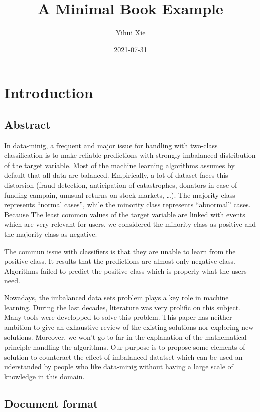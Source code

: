 \documentclass[
]{report}
\title{A Minimal Book Example}
\author{Yihui Xie}
\date{2021-07-31}
\begin{document}
\maketitle

{
\setcounter{tocdepth}{1}
\tableofcontents
}
\hypertarget{introduction}{%
\chapter{Introduction}\label{introduction}}

\hypertarget{abstract}{%
\section{Abstract}\label{abstract}}

In data-minig, a frequent and major issue for handling with two-class classification is to make reliable predictions with strongly imbalanced distribution of the target variable. Most of the machine learning algorithms assumes by default that all data are balanced. Empirically, a lot of dataset faces this distorsion (fraud detection, anticipation of catastrophes, donators in case of funding campain, unusual returns on stock markets, \ldots). The majority class represents ``normal cases'', while the minority class represents ``abnormal'' cases. Because The least common values of the target variable are linked with events which are very relevant for users, we considered the minority class as positive and the majority class as negative.

The commun issue with classifiers is that they are unable to learn from the positive class. It results that the predictions are almost only negative class. Algorithms failed to predict the positive class which is properly what the users need.

Nowadays, the imbalanced data sets problem plays a key role in machine learning. During the last decades, literature was very prolific on this subject. Many tools were developped to solve this problem. This paper has neither ambition to give an exhaustive review of the existing solutions nor exploring new solutions. Moreover, we won't go to far in the explanation of the mathematical principle handling the algorithms. Our purpose is to propose some elements of solution to counteract the effect of imbalanced datatset which can be used an uderstanded by people who like data-minig without having a large scale of knowledge in this domain.

\hypertarget{document-format}{%
\section{Document format}\label{document-format}}
\end{document}
